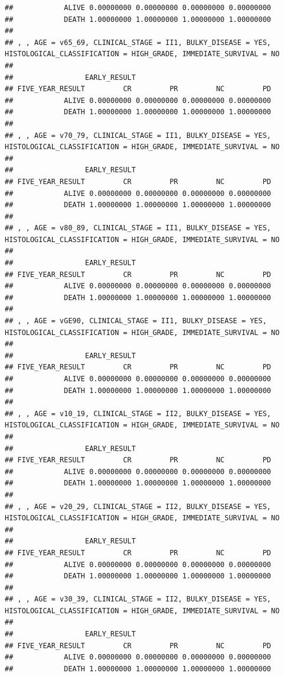 \documentclass[]{article}
\begin{document}
\begin{verbatim}
##            ALIVE 0.00000000 0.00000000 0.00000000 0.00000000
##            DEATH 1.00000000 1.00000000 1.00000000 1.00000000
## 
## , , AGE = v65_69, CLINICAL_STAGE = II1, BULKY_DISEASE = YES, HISTOLOGICAL_CLASSIFICATION = HIGH_GRADE, IMMEDIATE_SURVIVAL = NO
## 
##                 EARLY_RESULT
## FIVE_YEAR_RESULT         CR         PR         NC         PD
##            ALIVE 0.00000000 0.00000000 0.00000000 0.00000000
##            DEATH 1.00000000 1.00000000 1.00000000 1.00000000
## 
## , , AGE = v70_79, CLINICAL_STAGE = II1, BULKY_DISEASE = YES, HISTOLOGICAL_CLASSIFICATION = HIGH_GRADE, IMMEDIATE_SURVIVAL = NO
## 
##                 EARLY_RESULT
## FIVE_YEAR_RESULT         CR         PR         NC         PD
##            ALIVE 0.00000000 0.00000000 0.00000000 0.00000000
##            DEATH 1.00000000 1.00000000 1.00000000 1.00000000
## 
## , , AGE = v80_89, CLINICAL_STAGE = II1, BULKY_DISEASE = YES, HISTOLOGICAL_CLASSIFICATION = HIGH_GRADE, IMMEDIATE_SURVIVAL = NO
## 
##                 EARLY_RESULT
## FIVE_YEAR_RESULT         CR         PR         NC         PD
##            ALIVE 0.00000000 0.00000000 0.00000000 0.00000000
##            DEATH 1.00000000 1.00000000 1.00000000 1.00000000
## 
## , , AGE = vGE90, CLINICAL_STAGE = II1, BULKY_DISEASE = YES, HISTOLOGICAL_CLASSIFICATION = HIGH_GRADE, IMMEDIATE_SURVIVAL = NO
## 
##                 EARLY_RESULT
## FIVE_YEAR_RESULT         CR         PR         NC         PD
##            ALIVE 0.00000000 0.00000000 0.00000000 0.00000000
##            DEATH 1.00000000 1.00000000 1.00000000 1.00000000
## 
## , , AGE = v10_19, CLINICAL_STAGE = II2, BULKY_DISEASE = YES, HISTOLOGICAL_CLASSIFICATION = HIGH_GRADE, IMMEDIATE_SURVIVAL = NO
## 
##                 EARLY_RESULT
## FIVE_YEAR_RESULT         CR         PR         NC         PD
##            ALIVE 0.00000000 0.00000000 0.00000000 0.00000000
##            DEATH 1.00000000 1.00000000 1.00000000 1.00000000
## 
## , , AGE = v20_29, CLINICAL_STAGE = II2, BULKY_DISEASE = YES, HISTOLOGICAL_CLASSIFICATION = HIGH_GRADE, IMMEDIATE_SURVIVAL = NO
## 
##                 EARLY_RESULT
## FIVE_YEAR_RESULT         CR         PR         NC         PD
##            ALIVE 0.00000000 0.00000000 0.00000000 0.00000000
##            DEATH 1.00000000 1.00000000 1.00000000 1.00000000
## 
## , , AGE = v30_39, CLINICAL_STAGE = II2, BULKY_DISEASE = YES, HISTOLOGICAL_CLASSIFICATION = HIGH_GRADE, IMMEDIATE_SURVIVAL = NO
## 
##                 EARLY_RESULT
## FIVE_YEAR_RESULT         CR         PR         NC         PD
##            ALIVE 0.00000000 0.00000000 0.00000000 0.00000000
##            DEATH 1.00000000 1.00000000 1.00000000 1.00000000

\end{verbatim}
\end{document}
